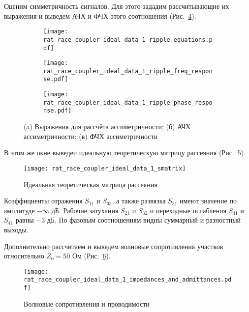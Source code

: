 Оценим симметричность сигналов. Для этого зададим рассчитывающие их выражения и выведем АЧХ и ФЧХ этого соотношения (Рис.~\ref{fig:rat_race_coupler_ideal_data_1_ripple_responses}).

\begin{figure}[!ht]
    \centering
    \begin{subfigure}[b]{\textwidth}
        \centering
        \texttt{[image: rat\_race\_coupler\_ideal\_data\_1\_ripple\_equations.pdf]}
        \caption{}%
    \label{fig:rat_race_coupler_ideal_ripple_equations}
    \end{subfigure}
    \vfill
    \begin{subfigure}[b]{0.45\textwidth}
        \centering
        \texttt{[image: rat\_race\_coupler\_ideal\_data\_1\_ripple\_freq\_response.pdf]}
        \caption{}%
    \label{fig:rat_race_coupler_ideal_data_1_ripple_freq_response}
    \end{subfigure}
    \hfill
    \begin{subfigure}[b]{0.45\textwidth}
        \centering
        \texttt{[image: rat\_race\_coupler\_ideal\_data\_1\_ripple\_phase\_response.pdf]}
        \caption{}%
    \label{fig:rat_race_coupler_ideal_data_1_ripple_phase_response}
    \end{subfigure}
    \caption{%
        (a) Выражения для рассчёта ассиметричности;
        (б) АЧХ ассиметричности;
        (в) ФЧХ ассиметричности
    }%
    \label{fig:rat_race_coupler_ideal_data_1_ripple_responses}
\end{figure}

В этом же окне выведеи идеальную теоретическую матрицу рассеяния (Рис.~\ref{fig:rat_race_coupler_ideal_data_1_smatrix}).
\begin{figure}[!ht]
    \centering
    \texttt{[image: rat\_race\_coupler\_ideal\_data\_1\_smatrix]}
    \caption{Идеальная теоретическая матрица рассеяния}%
    \label{fig:rat_race_coupler_ideal_data_1_smatrix}
\end{figure}
Коэффициенты отражения $S_{11}$ и $S_{33}$, а также развязка $S_{31}$ имеют значение по амплитуде $-\infty \text{~дБ}$. Рабочие затухания $S_{21}$ и $S_{32}$ и переходные ослабления $S_{41}$ и $S_{41}$ равны $-3 \text{~дБ}$. По фазовым соотношениям видны суммарный и разностный выходы.

Дополнительно рассчитаем и выведем волновые сопротивления участков относительно $Z_0 = 50 \text{~Ом}$ (Рис.~\ref{fig:rat_race_coupler_ideal_data_1_impedances_and_admittances}).
\begin{figure}[!ht]
    \centering
    \texttt{[image: rat\_race\_coupler\_ideal\_data\_1\_impedances\_and\_admittances.pdf]}
    \caption{Волновые сопротивления и проводимости}%
    \label{fig:rat_race_coupler_ideal_data_1_impedances_and_admittances}
\end{figure}

